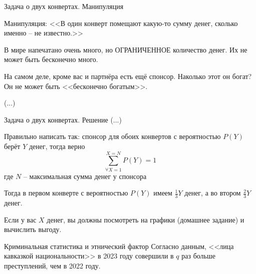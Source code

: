 \begin{frame}{Задача о двух конвертах. Манипуляция}

Манипуляция: 
<<В один конверт помещают какую-то сумму денег,
сколько именно -- не известно.>>

В мире напечатано очень много, но ОГРАНИЧЕННОЕ 
количество денег.
Их не может быть бесконечно много.

На самом деле, кроме вас и партнёра есть ещё спонсор.
Наколько этот он богат?
Он не может быть <<бесконечно богатым>>.

(...)
\end{frame}

\begin{frame}{Задача о двух конвертах. Решение}
\small
(...)

Правильно написать так:
спонсор для обоих конвертов с вероятностью $P(Y)$ берёт $Y$ денег,
тогда верно
\begin{equation}
\sum_{\forall X=1}^{X=N} P(Y) = 1
\end{equation}
где $N$ -- максимальная сумма денег у спонсора	

Тогда в первом конверте с вероятностью $P(Y)$ имеем $\frac{1}{3}Y$ денег,
а во втором $\frac{2}{3}Y$ денег.


Если у вас $X$ денег,
вы должны посмотреть на графики (домашнее задание)
и вычислить выгоду.

	



\end{frame}

\begin{frame}[fragile,t]{Криминальная статистика и этнический фактор}
\small
Согласно данным, <<лица кавказкой национальности>> в 2023 году совершили 
в $q$ раз больше преступлений, чем в 2022 году.

	
	
\end{frame}


